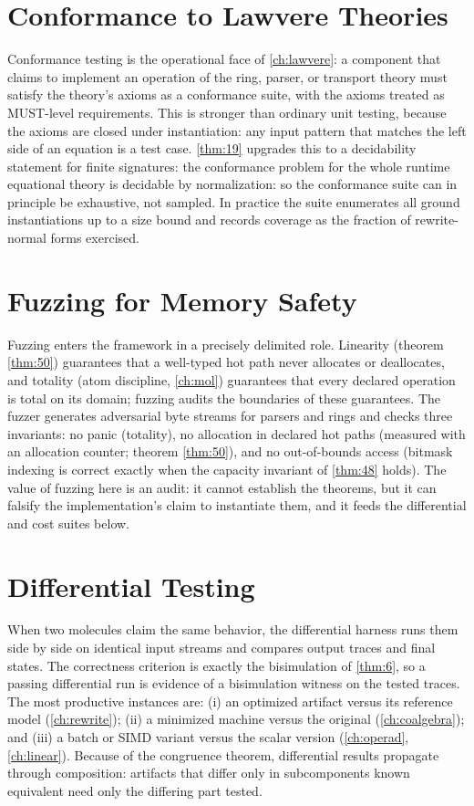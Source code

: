 \section{Conformance to Lawvere Theories}
Conformance testing is the operational face of \autoref{ch:lawvere}: a component that claims to implement an operation of the ring, parser, or transport theory must satisfy the theory's axioms as a conformance suite, with the axioms treated as MUST-level requirements. This is stronger than ordinary unit testing, because the axioms are closed under instantiation: any input pattern that matches the left side of an equation is a test case. \ref{thm:19} upgrades this to a decidability statement for finite signatures: the conformance problem for the whole runtime equational theory is decidable by normalization: so the conformance suite can in principle be exhaustive, not sampled. In practice the suite enumerates all ground instantiations up to a size bound and records coverage as the fraction of rewrite-normal forms exercised.

\section{Fuzzing for Memory Safety}
Fuzzing enters the framework in a precisely delimited role. Linearity (theorem \ref{thm:50}) guarantees that a well-typed hot path never allocates or deallocates, and totality (atom discipline, \autoref{ch:mol}) guarantees that every declared operation is total on its domain; fuzzing audits the boundaries of these guarantees. The fuzzer generates adversarial byte streams for parsers and rings and checks three invariants: no panic (totality), no allocation in declared hot paths (measured with an allocation counter; theorem \ref{thm:50}), and no out-of-bounds access (bitmask indexing is correct exactly when the capacity invariant of \ref{thm:48} holds). The value of fuzzing here is an audit: it cannot establish the theorems, but it can falsify the implementation's claim to instantiate them, and it feeds the differential and cost suites below.

\section{Differential Testing}
When two molecules claim the same behavior, the differential harness runs them side by side on identical input streams and compares output traces and final states. The correctness criterion is exactly the bisimulation of \ref{thm:6}, so a passing differential run is evidence of a bisimulation witness on the tested traces. The most productive instances are: (i) an optimized artifact versus its reference model (\autoref{ch:rewrite}); (ii) a minimized machine versus the original (\autoref{ch:coalgebra}); and (iii) a batch or SIMD variant versus the scalar version (\autoref{ch:operad}, \autoref{ch:linear}). Because of the congruence theorem, differential results propagate through composition: artifacts that differ only in subcomponents known equivalent need only the differing part tested.

